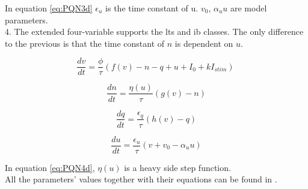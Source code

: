 In equation \ref{eq:PQN3d} \(\epsilon_u\) is the time constant of u. 
\(v_0\), \(\alpha_uu\) are model parameters.\\

4. The extended four-variable supports the \acrshort{lts} and \acrshort{ib} classes. The only difference to the previous is that the time constant of $n$ is dependent on $u$.

\begin{equation}
    \frac{dv}{dt}=\frac{\phi}{\tau}\left(f\left(v\right)-n-q+u+I_0+kI_{stim}\right)\ 
    \label{eq:PQN4a}
\end{equation}

\begin{equation}
    \frac{dn}{dt}=\frac{\eta(u)}{\tau}(g\left(v\right)-n)
    \label{eq:PQN4b}
\end{equation}

\begin{equation}
    \frac{dq}{dt}=\frac{\epsilon_q}{\tau}(h\left(v\right)-q)
    \label{eq:PQN4c}
\end{equation}

\begin{equation}
    \frac{du}{dt}=\frac{\epsilon_u}{\tau}(v+v_0-\alpha_uu)
    \label{eq:PQN4d}
\end{equation}

In equation \ref{eq:PQN4d}, \(\eta(u)\) is a heavy side step function.\\

All the parameters’ values together with their equations can be found in \cite{Nanami}.